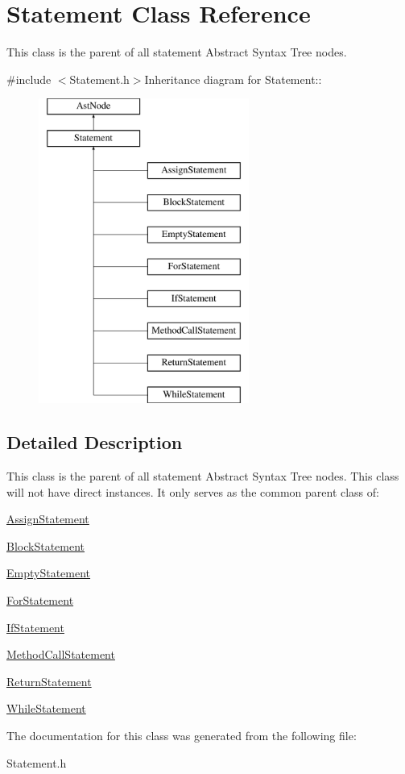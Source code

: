 \hypertarget{classStatement}{
\section{Statement Class Reference}
\label{classStatement}
}


This class is the parent of all statement Abstract Syntax Tree nodes.  


{\ttfamily \#include $<$Statement.h$>$}Inheritance diagram for Statement::\begin{figure}[H]
\begin{center}
\leavevmode
\includegraphics[height=10cm]{classStatement}
\end{center}
\end{figure}


\subsection{Detailed Description}
This class is the parent of all statement Abstract Syntax Tree nodes. This class will not have direct instances. It only serves as the common parent class of:


\begin{DoxyItemize}
\item \hyperlink{classAssignStatement}{AssignStatement}
\item \hyperlink{classBlockStatement}{BlockStatement}
\item \hyperlink{classEmptyStatement}{EmptyStatement}
\item \hyperlink{classForStatement}{ForStatement}
\item \hyperlink{classIfStatement}{IfStatement}
\item \hyperlink{classMethodCallStatement}{MethodCallStatement}
\item \hyperlink{classReturnStatement}{ReturnStatement}
\item \hyperlink{classWhileStatement}{WhileStatement} 
\end{DoxyItemize}

The documentation for this class was generated from the following file:\begin{DoxyCompactItemize}
\item 
Statement.h\end{DoxyCompactItemize}
